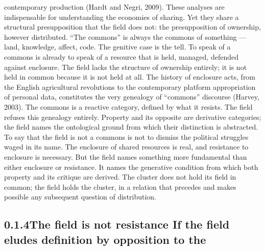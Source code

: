 contemporary production (Hardt and Negri, 2009). These analyses are indispensable for understanding the economies of sharing. Yet they share a structural presupposition that the field does not: the presupposition of ownership, however distributed. “The commons” is always the commons of something — land, knowledge, affect, code. The genitive case is the tell. To speak of a commons is already to speak of a resource that is held, managed, defended against enclosure. The field lacks the structure of ownership entirely; it is not held in common because it is not held at all. The history of enclosure acts, from the English agricultural revolutions to the contemporary platform appropriation of personal data, constitutes the very genealogy of “commons” discourse (Harvey, 2003). The commons is a reactive category, defined by what it resists. The field refuses this genealogy entirely. Property and its opposite are derivative categories; the field names the ontological ground from which their distinction is abstracted. To say that the field is not a commons is not to dismiss the political struggles waged in its name. The enclosure of shared resources is real, and resistance to enclosure is necessary. But the field names something more fundamental than either enclosure or resistance. It names the generative condition from which both property and its critique are derived. The cluster does not hold its field in common; the field holds the cluster, in a relation that precedes and makes possible any subsequent question of distribution.

\subsection{0.1.4\quad The field is not resistance If the field eludes definition by opposition to the}

